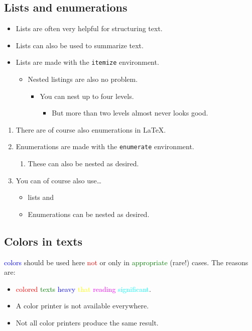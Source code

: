 \documentclass{llncs}
\begin{document}
\subsection{Lists and enumerations}

\begin{itemize}
  \item Lists are often very helpful for structuring text. \item Lists can also be used to summarize text.
  \item Lists are made with the \texttt{itemize} environment.
        \begin{itemize}
          \item Nested listings are also no problem.
                \begin{itemize}
                  \item You can nest up to four levels.
                        \begin{itemize}
                          \item But more than two levels almost never looks good.
                        \end{itemize}
                \end{itemize}
        \end{itemize}
\end{itemize}

\begin{enumerate}
  \item There are of course also enumerations in \LaTeX.
  \item Enumerations are made with the \texttt{enumerate} environment.
        \begin{enumerate}
          \item These can also be nested as desired.
        \end{enumerate}
  \item You can of course also use\dots
        \begin{itemize}
          \item lists and
          \item Enumerations can be nested as desired.
        \end{itemize}
\end{enumerate}

\subsection{Colors in texts}

\textcolor{blue}{colors} should be used here \textcolor{red}{not} or only in \textcolor{green}{appropriate} (rare!) cases. The reasons are:
\begin{itemize}
  \item \textcolor{red}{colored} \textcolor{green}{texts} \textcolor{blue}{heavy} \textcolor{yellow}{that} \textcolor{magenta}{reading} \textcolor{cyan}{significant}.
  \item A color printer is not available everywhere.
  \item Not all color printers produce the same result.
\end{itemize}
\end{document}
